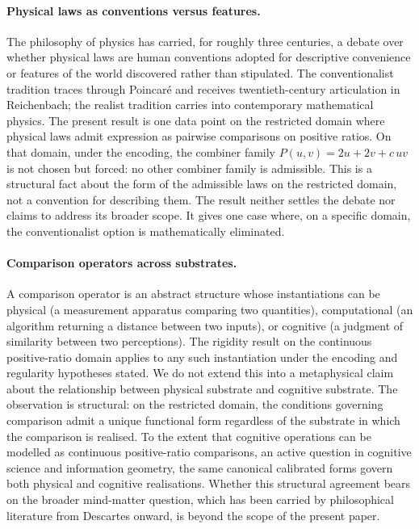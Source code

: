 \documentclass[11pt,a4paper]{article}
\theoremstyle{definition}
\theoremstyle{remark}
\begin{document}
\paragraph{Physical laws as conventions versus features.} The
philosophy of physics has carried, for roughly three centuries, a
debate over whether physical laws are human conventions adopted for
descriptive convenience or features of the world discovered rather
than stipulated. The conventionalist tradition traces through
Poincar\'e and receives twentieth-century articulation in Reichenbach;
the realist tradition carries into contemporary mathematical physics.
The present result is one data point on the restricted domain where
physical laws admit expression as pairwise comparisons on positive
ratios. On that domain, under the encoding, the combiner family
$P(u, v) = 2u + 2v + c\,uv$ is not chosen but forced: no other
combiner family is admissible. This is a structural fact about the
form of the admissible laws on the restricted domain, not a convention
for describing them. The result neither settles the debate nor claims
to address its broader scope. It gives one case where, on a specific
domain, the conventionalist option is mathematically eliminated.

\paragraph{Comparison operators across substrates.} A comparison
operator is an abstract structure whose instantiations can be physical
(a measurement apparatus comparing two quantities), computational (an
algorithm returning a distance between two inputs), or cognitive (a
judgment of similarity between two perceptions). The rigidity result
on the continuous positive-ratio domain applies to any such
instantiation under the encoding and regularity hypotheses stated. We
do not extend this into a metaphysical claim about the relationship
between physical substrate and cognitive substrate. The observation is
structural: on the restricted domain, the conditions governing
comparison admit a unique functional form regardless of the substrate
in which the comparison is realised. To the extent that cognitive
operations can be modelled as continuous positive-ratio comparisons,
an active question in cognitive science and information geometry, the
same canonical calibrated forms govern both physical and cognitive
realisations. Whether this structural agreement bears on the broader
mind-matter question, which has been carried by philosophical
literature from Descartes onward, is beyond the scope of the present
paper.
\end{document}

